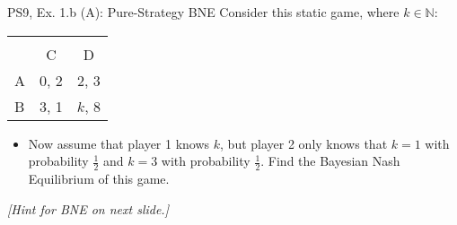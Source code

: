 \begin{frame}{PS9, Ex. 1.b (A): Pure-Strategy BNE}
    Consider this static game, where $k\in\mathbb{N}:$
    \vspace{-16pt}
    \begin{table}
      \begin{tabular}{l|c|c|}
        \multicolumn{1}{c}{} & \multicolumn{2}{c}{} \\
        \multicolumn{1}{c}{} & \multicolumn{1}{c}{C} & \multicolumn{1}{c}{D} \\\cline{2-3}
        A & 0, 2 & 2, 3 \\\cline{2-3}
        B & 3, 1 & $k$, 8 \\\cline{2-3}
      \end{tabular}
    \end{table}
    \vspace{-4pt}
    \begin{itemize}
      \item[(b)] Now assume that player 1 knows $k$, but player 2 only knows that $k = 1$ with probability $\frac{1}{2}$ and $k = 3$ with probability $\frac{1}{2}$. Find the Bayesian Nash Equilibrium of this game.
    \end{itemize}
    \textit{[Hint for BNE on next slide.]}
    \vfill\null
\end{frame}
